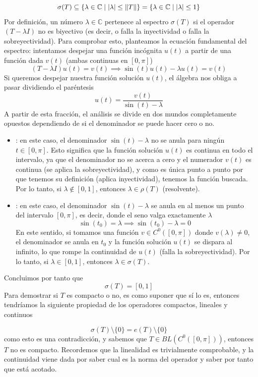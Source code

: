 \begin{ejercicio}
    \begin{equation*}
        \sigma(T)\subseteq \{\lambda \in \mathbb{C}\mid |\lambda| \leq \|T\|\} = \{\lambda \in \mathbb{C}\mid |\lambda| \leq 1\}
    \end{equation*}
    Por definición, un número $\lambda \in \mathbb{C}$ pertenece al espectro $\sigma(T)$ si el operador $(T - \lambda I)$ no es biyectivo (es decir, o falla la inyectividad o falla la sobreyectividad). Para comprobar esto, planteamos la ecuación fundamental del espectro: intentamos despejar una función incógnita $u(t)$ a partir de una función dada $v(t)$ (ambas continuas en $[0,\pi]$)
    $$(T - \lambda I)u(t) = v(t) \implies \sin(t)u(t) - \lambda u(t) = v(t)$$
    Si queremos despejar nuestra función solución $u(t)$, el álgebra nos obliga a pasar dividiendo el paréntesis
    $$u(t) = \frac{v(t)}{\sin(t) - \lambda}$$
    A partir de esta fracción, el análisis se divide en dos mundos completamente opuestos dependiendo de si el denominador se puede hacer cero o no.
    \begin{itemize}
        \item {}: en este caso, el denominador $\sin(t) - \lambda$ no se anula para ningún \mbox{$t \in [0,\pi]$}. Esto significa que la función solución $u(t)$ es continua en todo el intervalo, ya que el denominador no se acerca a cero y el numerador $v(t)$ es continua (se aplica la sobreyectividad), y como es única punto a punto por que tenemos su definición (aplica inyectividad), tenemos la función buscada. Por lo tanto, si $\lambda \notin [0,1]$, entonces $\lambda \in \rho(T)$ (resolvente).
        \item {}: en este caso, el denominador $\sin(t) - \lambda$ se anula en al menos un punto del intervalo $[0,\pi]$, es decir, donde el seno valga exactamente $\lambda$
        $$\sin(t_0) = \lambda \implies \sin(t_0) - \lambda = 0$$
        En este sentido, si tomamos una función $v\in C^0([0,\pi])$ donde $v(\lambda)\neq 0$, el denominador se anula en $t_0$ y la función solución $u(t)$ se dispara al infinito, lo que rompe la continuidad de $u(t)$ (falla la sobreyectividad). Por lo tanto, si $\lambda \in [0,1]$, entonces $\lambda \in \sigma(T)$.
    \end{itemize}
    Concluimos por tanto que
    \begin{equation*}
        \sigma(T) = [0,1]
    \end{equation*}
    Para demostrar si $T$ es compacto o no, es como suponer que sí lo es, entonces tendríamos la siguiente propiedad de los operadores compactos, lineales y continuos

    \begin{equation*}
        \sigma(T) \setminus \{0\}= e(T) \setminus \{0\}
    \end{equation*}
    como esto es una contradicción, y sabemos que $T\in BL(C^0([0,\pi]))$, entonces $T$ no es compacto. Recordemos que la linealidad es trivialmente comprobable, y la continuidad viene dada por saber cual es la norma del operador y saber por tanto que está acotado.
\end{ejercicio}

